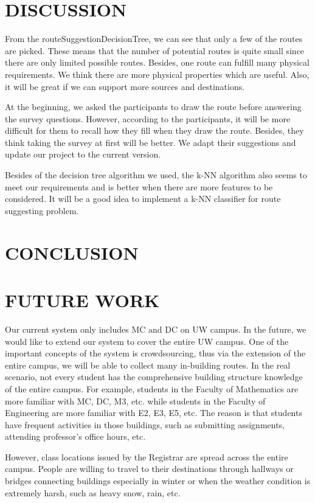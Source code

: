 \documentclass{sigchi}
\begin{document}
\section{DISCUSSION}
From the routeSuggestionDecisionTree, we can see that only a few of the routes are picked. These means that the number of potential routes is quite small since there are only limited possible routes. Besides, one route can fulfill many physical requirements. We think there are more physical properties which are useful. Also, it will be great if we can support more sources and destinations.


At the beginning, we asked the participants to draw the route before answering the survey questions. However, according to the participants, it will be more difficult for them to recall how they fill when they draw the route. Besides, they think taking the survey at first will be better. We adapt their suggestions and update our project to the current version.


Besides of the decision tree algorithm we used, the k-NN algorithm also seems to meet our requirements and is better when there are more features to be considered. It will be a good idea to implement a k-NN classifier for route suggesting problem. 

\section{CONCLUSION}



\section{FUTURE WORK}
Our current system only includes MC and DC on UW campus. In the future, we would like to extend our system to cover the entire UW campus. One of the important concepts of the system is crowdsourcing, thus via the extension of the entire campus, we will be able to collect many in-building routes. In the real scenario, not every student has the comprehensive building structure knowledge of the entire campus. For example, students in the Faculty of Mathematics are more familiar with MC, DC, M3, etc. while students in the Faculty of Engineering are more familiar with E2, E3, E5, etc. The reason is that students have frequent activities in those buildings, such as submitting assignments, attending professor’s office hours, etc. 


However, class locations issued by the Registrar are spread across the entire campus. People are willing to travel to their destinations through hallways or bridges connecting buildings especially in winter or when the weather condition is extremely harsh, such as heavy snow, rain, etc. 
\end{document}
